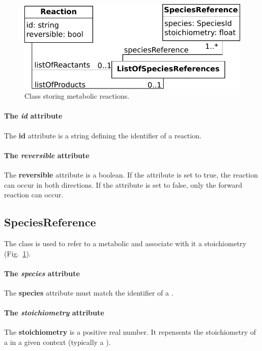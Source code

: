 \begin{figure}
  \centering
  \includegraphics[scale=0.8]{figures/metabolism_reaction}
  \caption{Class storing metabolic reactions.}
\label{fig:metabolism_reaction}
\end{figure}

\paragraph{The \textit{id} attribute}
The \textbf{id} attribute is a string defining the identifier of a reaction.

\paragraph{The \textit{reversible} attribute}
The \textbf{reversible} attribute is a boolean.
If the attribute is set to true, the reaction can occur in both directions.
If the attribute is set to false, only the forward reaction can occur.


\subsection{SpeciesReference}
\label{sec:species_reference}

The \speciesreference{} class is used to refer to a metabolic \species{}
and associate with it a stoichiometry (Fig.~\ref{fig:metabolism_reaction}).

\paragraph{The \textit{species} attribute}
The \textbf{species} attribute must match the identifier of a \species{}.

\paragraph{The \textit{stoichiometry} attribute}
The \textbf{stoichiometry} is a positive real number.
It repensents the stoichiometry of a \species{} in a given context
(typically a \reaction).


